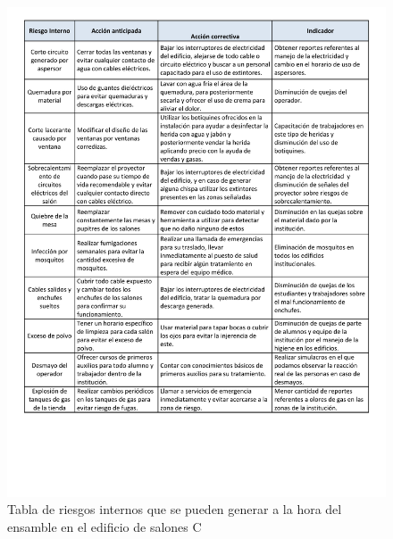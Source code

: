  \begin{figure}[H]
        \centering
        \includegraphics[trim = {1mm 40mm 1mm 1mm},clip,scale=0.285]{19/Img/accionAnti.pdf}
        \caption{Tabla de riesgos internos que se pueden generar a la hora del ensamble en el edificio de salones C}
        \label{fig:accionAnti}
    \end{figure}

